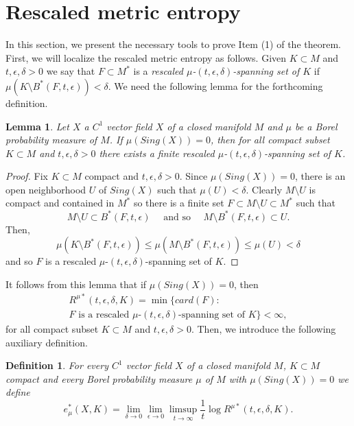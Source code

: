 \documentclass{amsart}
\newtheorem{lem}{Lemma}
\newtheorem{definition}{Definition}
\numberwithin{equation}{section}
\begin{document}
\section{Rescaled metric entropy}
\label{hop}








\noindent
In this section, we present the necessary tools to prove Item (1) of the theorem.
First, we will localize the rescaled metric entropy as follows.
Given $K\subset M$ and $t,\epsilon,\delta>0$ we
say that $F\subset M^*$ is a {\em rescaled $\mu$-$(t,\epsilon,\delta)$-spanning set of $K$} if $\mu(K\setminus B^*(F,t,\epsilon))<\delta.$
We need the following lemma for the forthcoming definition.

\begin{lem}
\label{paja}
Let $X$ a $C^1$ vector field $X$ of a closed manifold $M$ and $\mu$ be a Borel probability measure of $M$. If $\mu(Sing(X))=0$, then for all compact subset $K\subset M$ and $t,\epsilon,\delta>0$ there exists a finite rescaled $\mu$-$(t,\epsilon,\delta)$-spanning set of $K$.
\end{lem}

\begin{proof}
Fix $K\subset M$ compact and $t,\epsilon,\delta>0$.
Since $\mu(Sing(X))=0$, there is an open neighborhood $U$ of $Sing(X)$ such that $\mu(U)<\delta$.
Clearly $M\setminus U$ is compact and contained in $M^*$ so there is a finite set $F\subset M\setminus U\subset M^*$ such that
$$
M\setminus U\subset B^*(F,t,\epsilon)\quad\mbox{ and so }\quad
M\setminus B^*(F,t,\epsilon)\subset U.
$$
Then,
$$
\mu(K\setminus B^*(F,t,\epsilon))\leq \mu(M\setminus B^*(F,t,\epsilon))\leq \mu(U)<\delta
$$
and so $F$ is a rescaled $\mu$-$(t,\epsilon,\delta)$-spanning set of $K$.
\end{proof}

It follows from this lemma that if $\mu(Sing(X))=0$, then
\begin{multline*}
R^{\mu*}(t,\epsilon,\delta,K)=\min\{card(F):\\
F\mbox{ is a rescaled $\mu$-$(t,\epsilon,\delta)$-spanning set of }K\}<\infty,
\end{multline*}
for all compact subset $K\subset M$ and $t,\epsilon,\delta>0$.
Then, we introduce the following auxiliary definition.

\begin{definition}
For every $C^1$ vector field $X$ of a closed manifold $M$, $K\subset M$ compact and every Borel probability measure $\mu$ of $M$ with $\mu(Sing(X))=0$ we define
$$
e^*_\mu(X,K)=\lim_{\delta\to0}\lim_{\epsilon\to0}\limsup_{t\to\infty}\frac{1}t\log R^{\mu*}(t,\epsilon,\delta,K).
$$
\end{definition}
\end{document}
